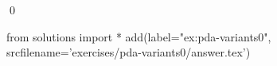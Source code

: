 
\begin{ex} 
  \label{ex:pda-variants0}
  
  \qed
\end{ex} 
\begin{python0}
from solutions import *
add(label="ex:pda-variants0",
    srcfilename='exercises/pda-variants0/answer.tex') 
\end{python0}
